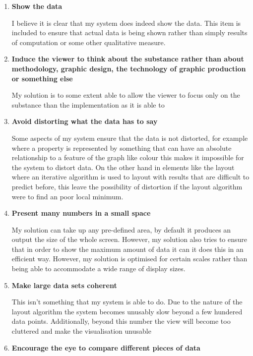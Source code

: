 \documentclass[12pt,a4paper]{article}
\begin{document}
\begin{enumerate}
\item {\bf Show the data}

I believe it is clear that my system does indeed show the data. This item is included to ensure that actual data is being shown rather than simply results of computation or some other qualitative measure.

\item {\bf Induce the viewer to think about the substance rather than about methodology, graphic design, the technology of graphic production or something else}

My solution is to some extent able to allow the viewer to focus only on the substance than the  implementation as it is able to 

\item {\bf Avoid distorting what the data has to say}

Some aspects of my system ensure that the data is not distorted, for example where a property is represented by something that can have an absolute relationship to a feature of the graph like colour this makes it impossible for the system to distort data. On the other hand in elements like the layout where an iterative algorithm is used to layout with results that are difficult to predict before, this leave the possibility of distortion if the layout algorithm were to find an poor local minimum. 

\item {\bf Present many numbers in a small space}

My solution can take up any pre-defined area, by default it produces an output the size of the whole screen. However, my solution also tries to ensure that in order to show the maximum amount of data it can it does this in an efficient way. However, my solution is optimised for certain scales rather than being able to accommodate a wide range of display sizes.

\item {\bf Make large data sets coherent}

This isn't something that my system is able to do. Due to the nature of the layout algorithm the system becomes unusably slow beyond a few hundered data points. Additionally, beyond this number the view will become too cluttered and make the visualisation unusable

\item {\bf Encourage the eye to compare different pieces of data}


\end{enumerate}
\end{document}
